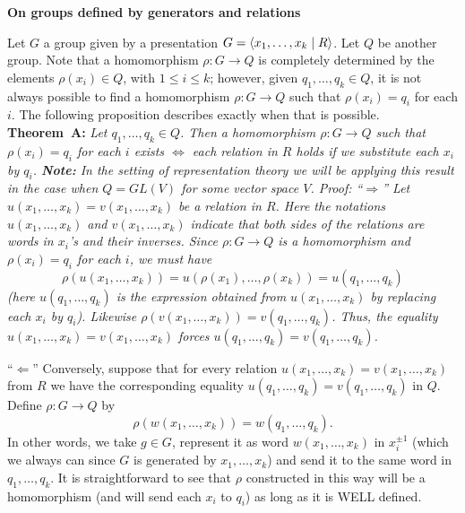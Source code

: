 \documentclass[12pt]{article}
\begin{document}
\newpage
\centerline {\bf On groups defined by generators and relations}
\skv
\sk Let $G$ a group given by a presentation $G={\langle} x_1,\ldots, x_k \mid R{\rangle}$. Let $Q$ be another group.
Note that a homomorphism $\rho:G\to Q$ is completely determined by the elements $\rho(x_i)\in Q$, with $1\leq i\leq k$; however, given
$q_1,\ldots,q_k\in Q$, it is not always possible to find a homomorphism $\rho:G\to Q$ such that $\rho(x_i)=q_i$ for each $i$. The following proposition describes exactly when that is possible.
\skv
{\bf Theorem~A: }\it Let $q_1,\ldots, q_k\in Q$. Then a homomorphism $\rho:G\to Q$ such that $\rho(x_i)=q_i$ for each $i$ exists $\iff$ each relation in $R$ holds if we substitute each $x_i$ by $q_i$.\rm
\skv
{\bf Note: } In the setting of representation theory we will be applying this result in the case when $Q=GL(V)$ for some vector space $V$.
\skv
{\it Proof: }\rm ``$\Rightarrow$'' Let $u(x_1,\ldots, x_k)=v(x_1,\ldots, x_k)$ be a relation in $R$. Here the notations 
$u(x_1,\ldots, x_k)$ and  $v(x_1,\ldots, x_k)$ indicate that both sides of the relations are words in $x_i$'s and their inverses. Since $\rho:G\to Q$ is a homomorphism and $\rho(x_i)=q_i$ for each $i$, we must have 
$$\rho(u(x_1,\ldots, x_k))=u(\rho(x_1),\ldots, \rho(x_k))=u(q_1,\ldots, q_k)$$ (here $u(q_1,\ldots, q_k)$ is the expression obtained 
from $u(x_1,\ldots, x_k)$ by replacing each $x_i$ by $q_i$). Likewise $\rho(v(x_1,\ldots, x_k))=v(q_1,\ldots, q_k)$. Thus, the equality $u(x_1,\ldots, x_k)=v(x_1,\ldots, x_k)$ forces $u(q_1,\ldots, q_k)=v(q_1,\ldots, q_k)$.
\skv

\sk ``$\Leftarrow$'' Conversely, suppose that for every relation $u(x_1,\ldots, x_k)=v(x_1,\ldots, x_k)$ from $R$ we have the corresponding equality $u(q_1,\ldots, q_k)=v(q_1,\ldots, q_k)$ in $Q$. Define $\rho:G\to Q$ by
$$\rho(w(x_1,\ldots,x_k))=w(q_1,\ldots, q_k).$$
In other words, we take $g\in G$, represent it as word  $w(x_1,\ldots,x_k)$ in $x_i^{\pm 1}$ (which we always can since $G$ is generated by $x_1,\ldots, x_k$) and send it to the same word in $q_1,\ldots, q_k$. It is straightforward to see that $\rho$ constructed
in this way will be a homomorphism (and will send each $x_i$ to $q_i$) as long as it is WELL defined.
\end{document}
